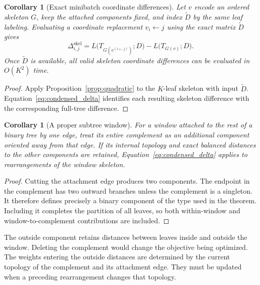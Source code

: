 \documentclass[11pt,a4paper]{article}
\makeatletter
\DeclareRobustCommand{\_}{\ifmmode\nfss@text{\textunderscore}\else\textunderscore\allowbreak\fi}
\newtheorem{corollary}[theorem]{Corollary}
\theoremstyle{definition}
\makeatother
\begin{document}
\begin{corollary}[Exact minibatch coordinate differences]
\label{cor:minibatch_gradient}
Let $v$ encode an ordered skeleton $G$, keep the attached components fixed, and index $\widetilde D$ by the same leaf labeling.
Evaluating a coordinate replacement $v_i\leftarrow j$ using the exact matrix $\widetilde D$ gives
\begin{equation}
 \Delta^{\mathrm{skel}}_{i,j}
 =L\bigl(T_{G(v^{(i\leftarrow j)})};D\bigr)
  -L\bigl(T_{G(v)};D\bigr).
 \label{eq:minibatch_gradient}
\end{equation}
Once $\widetilde D$ is available, all valid skeleton coordinate differences can be evaluated in $O(K^2)$ time.
\end{corollary}
\begin{proof}
Apply Proposition~\ref{prop:quadratic} to the $K$-leaf skeleton with input $\widetilde D$.
Equation~\eqref{eq:condensed_delta} identifies each resulting skeleton difference with the corresponding full-tree difference.
\end{proof}

\begin{corollary}[A proper subtree window]
\label{cor:outside}
For a window attached to the rest of a binary tree by one edge, treat its entire complement as an additional component oriented away from that edge.
If its internal topology and exact balanced distances to the other components are retained, Equation~\eqref{eq:condensed_delta} applies to rearrangements of the window skeleton.
\end{corollary}
\begin{proof}
Cutting the attachment edge produces two components.
The endpoint in the complement has two outward branches unless the complement is a singleton.
It therefore defines precisely a binary component of the type used in the theorem.
Including it completes the partition of all leaves, so both within-window and window-to-complement contributions are included.
\end{proof}

The outside component retains distances between leaves inside and outside the window.
Deleting the complement would change the objective being optimized.
The weights entering the outside distances are determined by the current topology of the complement and its attachment edge.
They must be updated when a preceding rearrangement changes that topology.
\end{document}
